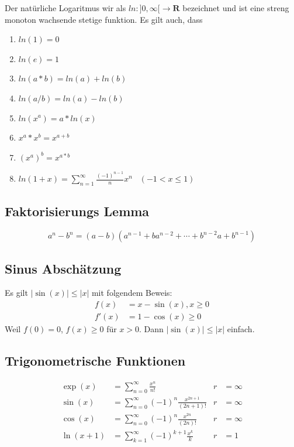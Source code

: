 \documentclass[8pt]{extarticle}
\def\sumk{\sum_{k=1}^\infty}
\def\sumn{\sum_{n=0}^\infty}
\def\sumk{\sum_{k=1}^\infty}
\def\sumn{\sum_{n=0}^\infty}
\begin{document}
\begin{multicols*}{3}
Der natürliche Logaritmus wir als $ln: ]0, \infty[ \rightarrow \mathbf{R}$ bezeichnet
und ist eine streng monoton wachsende stetige funktion. Es gilt auch, dass
\begin{enumerate}
  \item $ln(1) = 0$
  \item $ln(e) = 1$
  \item $ln(a * b) = ln(a) + ln(b)$
  \item $ln(a / b) = ln(a) - ln(b)$
  \item $ln(x^a) = a * ln(x)$
  \item $x^a * x^b = x^{a + b}$
  \item $(x^a)^b = x^{a * b}$
  \item $ln(1+x) = \sum_{n=1}^{\infty} \frac{(-1)^{n-1}}{n} x^n \;\;\; (-1 < x \leq 1)$
\end{enumerate}

\subsection{Faktorisierungs Lemma}

$$
  a^n - b^n = (a-b)(a^{n-1} + ba^{n-2} + \cdots + b^{n-2}a + b^{n-1})
$$

\subsection{Sinus Abschätzung}

Es gilt $|\sin(x)| \leq |x|$ mit folgendem Beweis:
\begin{align*}
  f(x) &= x - \sin(x), x \geq 0 \\
  f'(x) &= 1 - \cos(x) \geq 0
\end{align*}
Weil $f(0) = 0$, $f(x) \geq 0$ für $x > 0$. Dann $|\sin(x)| \leq |x|$ einfach. 



\subsection{Trigonometrische Funktionen}
\begin{align*}
\exp(x) &= \sumn \frac{x^n}{n!} & r &= \infty \\
\sin(x) &= \sumn (-1)^n \frac{x^{2n + 1}}{(2n + 1)!} & r &= \infty \\
\cos(x) &= \sumn (-1)^n \frac{x^{2n}}{(2n)!} & r &= \infty \\
\ln(x + 1) &= \sumk (-1)^{k+1} \frac{x^k}{k} & r &= 1
\end{align*}


\end{multicols*}
\end{document}
